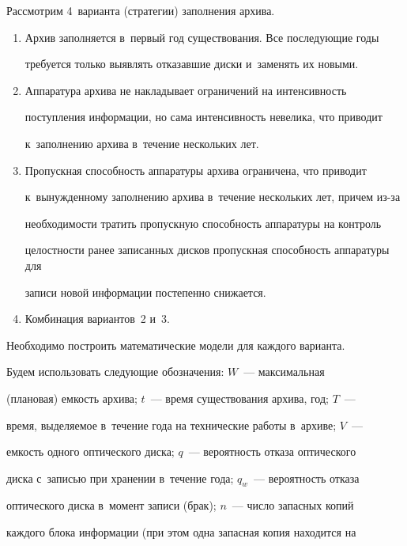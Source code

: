   Рассмотрим 4~варианта (стратегии) заполнения архива.


  \begin{enumerate}[1.]


  \item Архив заполняется в~первый год существования. Все последующие годы 


требуется только выявлять отказавшие диски и~заменять их новыми.


  \item Аппаратура архива не накладывает ограничений на интенсивность 


поступления информации, но сама интенсивность невелика, что приводит 


к~заполнению архива в~течение нескольких лет.


  \item Пропускная способность аппаратуры архива ограничена, что приводит 


к~вынужденному заполнению архива в~течение нескольких лет, причем из-за 


необходимости тратить пропускную способность аппаратуры на контроль 


целостности ранее записанных дисков пропускная способность аппаратуры для 


записи новой информации постепенно снижается.


  \item Комбинация вариантов~2 и~3.


  \end{enumerate}


  


  Необходимо построить математические модели для каждого варианта.


  


  Будем использовать следующие обозначения: $W$~--- максимальная 


(плановая) емкость архива; $t$~--- время существования архива, год; $T$~--- 


время, выделяемое в~течение года на технические работы в~архиве; $V$~--- 


емкость одного оптического диска; $q$~--- вероятность отказа оптического 


диска с~записью при хранении в~течение года; $q_w$~--- вероятность отказа 


оптического диска в~момент записи (брак); $n$~--- число запасных копий 


каждого блока информации (при этом одна запасная копия находится на 


